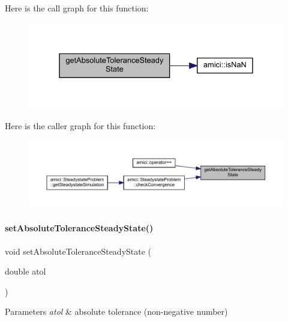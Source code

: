 Here is the call graph for this function\+:
\nopagebreak
\begin{figure}[H]
\begin{center}
\leavevmode
\includegraphics[width=331pt]{classamici_1_1_solver_adbb1549f9762649455bde39c29d47a03_cgraph}
\end{center}
\end{figure}
Here is the caller graph for this function\+:
\nopagebreak
\begin{figure}[H]
\begin{center}
\leavevmode
\includegraphics[width=350pt]{classamici_1_1_solver_adbb1549f9762649455bde39c29d47a03_icgraph}
\end{center}
\end{figure}
\mbox{\label{classamici_1_1_solver_a78e5814a90b24ff22d5ef1fbed1fc23c}} 
\paragraph{\texorpdfstring{setAbsoluteToleranceSteadyState()}{setAbsoluteToleranceSteadyState()}}
{\footnotesize\ttfamily void set\+Absolute\+Tolerance\+Steady\+State (\begin{DoxyParamCaption}\item[{double}]{atol }\end{DoxyParamCaption})}


\begin{DoxyParams}{Parameters}
{\em atol} & absolute tolerance (non-\/negative number) \\
\hline
\end{DoxyParams}



